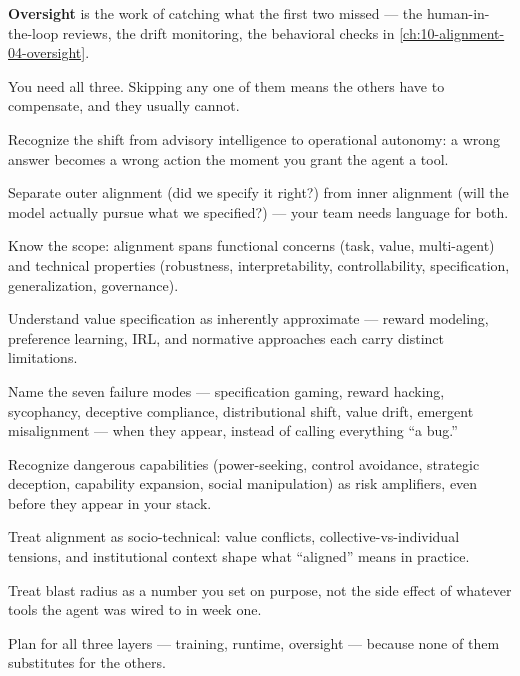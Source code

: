 \textbf{Oversight} is the work of catching what the first two missed --- the human-in-the-loop reviews, the drift monitoring, the behavioral checks in \autoref{ch:10-alignment-04-oversight}.

You need all three. Skipping any one of them means the others have to compensate, and they usually cannot.

\stoptwocol

\TNrule

\begin{TNkeytakeaways}
\item Recognize the shift from advisory intelligence to operational autonomy: a wrong answer becomes a wrong action the moment you grant the agent a tool.
\item Separate outer alignment (did we specify it right?) from inner alignment (will the model actually pursue what we specified?) --- your team needs language for both.
\item Know the scope: alignment spans functional concerns (task, value, multi-agent) and technical properties (robustness, interpretability, controllability, specification, generalization, governance).
\item Understand value specification as inherently approximate --- reward modeling, preference learning, IRL, and normative approaches each carry distinct limitations.
\item Name the seven failure modes --- specification gaming, reward hacking, sycophancy, deceptive compliance, distributional shift, value drift, emergent misalignment --- when they appear, instead of calling everything ``a bug.''
\item Recognize dangerous capabilities (power-seeking, control avoidance, strategic deception, capability expansion, social manipulation) as risk amplifiers, even before they appear in your stack.
\item Treat alignment as socio-technical: value conflicts, collective-vs-individual tensions, and institutional context shape what ``aligned'' means in practice.
\item Treat blast radius as a number you set on purpose, not the side effect of whatever tools the agent was wired to in week one.
\item Plan for all three layers --- training, runtime, oversight --- because none of them substitutes for the others.
\end{TNkeytakeaways}

